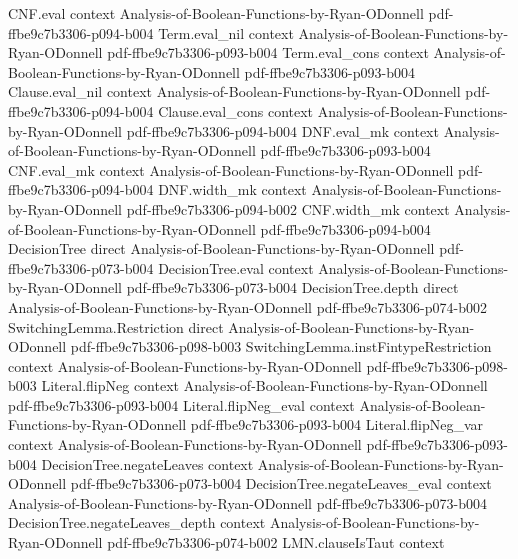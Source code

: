 \begin{lemma}
\proofstep
  {CNF.eval}
  {context}
  {Analysis-of-Boolean-Functions-by-Ryan-ODonnell}
  {pdf-ffbe9c7b3306-p094-b004}
\proofstep
  {Term.eval_nil}
  {context}
  {Analysis-of-Boolean-Functions-by-Ryan-ODonnell}
  {pdf-ffbe9c7b3306-p093-b004}
\proofstep
  {Term.eval_cons}
  {context}
  {Analysis-of-Boolean-Functions-by-Ryan-ODonnell}
  {pdf-ffbe9c7b3306-p093-b004}
\proofstep
  {Clause.eval_nil}
  {context}
  {Analysis-of-Boolean-Functions-by-Ryan-ODonnell}
  {pdf-ffbe9c7b3306-p094-b004}
\proofstep
  {Clause.eval_cons}
  {context}
  {Analysis-of-Boolean-Functions-by-Ryan-ODonnell}
  {pdf-ffbe9c7b3306-p094-b004}
\proofstep
  {DNF.eval_mk}
  {context}
  {Analysis-of-Boolean-Functions-by-Ryan-ODonnell}
  {pdf-ffbe9c7b3306-p093-b004}
\proofstep
  {CNF.eval_mk}
  {context}
  {Analysis-of-Boolean-Functions-by-Ryan-ODonnell}
  {pdf-ffbe9c7b3306-p094-b004}
\proofstep
  {DNF.width_mk}
  {context}
  {Analysis-of-Boolean-Functions-by-Ryan-ODonnell}
  {pdf-ffbe9c7b3306-p094-b002}
\proofstep
  {CNF.width_mk}
  {context}
  {Analysis-of-Boolean-Functions-by-Ryan-ODonnell}
  {pdf-ffbe9c7b3306-p094-b004}
\proofstep
  {DecisionTree}
  {direct}
  {Analysis-of-Boolean-Functions-by-Ryan-ODonnell}
  {pdf-ffbe9c7b3306-p073-b004}
\proofstep
  {DecisionTree.eval}
  {context}
  {Analysis-of-Boolean-Functions-by-Ryan-ODonnell}
  {pdf-ffbe9c7b3306-p073-b004}
\proofstep
  {DecisionTree.depth}
  {direct}
  {Analysis-of-Boolean-Functions-by-Ryan-ODonnell}
  {pdf-ffbe9c7b3306-p074-b002}
\proofstep
  {SwitchingLemma.Restriction}
  {direct}
  {Analysis-of-Boolean-Functions-by-Ryan-ODonnell}
  {pdf-ffbe9c7b3306-p098-b003}
\proofstep
  {SwitchingLemma.instFintypeRestriction}
  {context}
  {Analysis-of-Boolean-Functions-by-Ryan-ODonnell}
  {pdf-ffbe9c7b3306-p098-b003}
\proofstep
  {Literal.flipNeg}
  {context}
  {Analysis-of-Boolean-Functions-by-Ryan-ODonnell}
  {pdf-ffbe9c7b3306-p093-b004}
\proofstep
  {Literal.flipNeg_eval}
  {context}
  {Analysis-of-Boolean-Functions-by-Ryan-ODonnell}
  {pdf-ffbe9c7b3306-p093-b004}
\proofstep
  {Literal.flipNeg_var}
  {context}
  {Analysis-of-Boolean-Functions-by-Ryan-ODonnell}
  {pdf-ffbe9c7b3306-p093-b004}
\proofstep
  {DecisionTree.negateLeaves}
  {context}
  {Analysis-of-Boolean-Functions-by-Ryan-ODonnell}
  {pdf-ffbe9c7b3306-p073-b004}
\proofstep
  {DecisionTree.negateLeaves_eval}
  {context}
  {Analysis-of-Boolean-Functions-by-Ryan-ODonnell}
  {pdf-ffbe9c7b3306-p073-b004}
\proofstep
  {DecisionTree.negateLeaves_depth}
  {context}
  {Analysis-of-Boolean-Functions-by-Ryan-ODonnell}
  {pdf-ffbe9c7b3306-p074-b002}
\proofstep
  {LMN.clauseIsTaut}
  {context}

\end{lemma}

